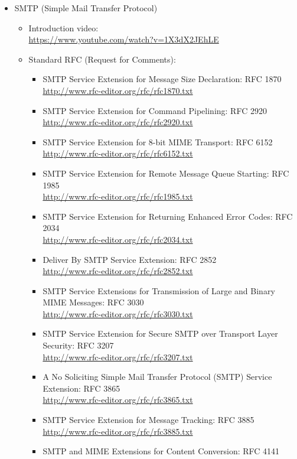 \begin{itemize}
\begin{itemize}
\end{itemize}
\item SMTP (Simple Mail Transfer Protocol)\\
\begin{itemize}
\item Introduction video:\\
\url{https://www.youtube.com/watch?v=1X3dX2JEhLE}
\item Standard RFC (Request for Comments): \\
\begin{itemize}
\item SMTP Service Extension for Message Size Declaration: RFC 1870\\
\url{http://www.rfc-editor.org/rfc/rfc1870.txt}
\item SMTP Service Extension for Command Pipelining: RFC 2920\\
\url{http://www.rfc-editor.org/rfc/rfc2920.txt}
\item SMTP Service Extension for 8-bit MIME Transport: RFC 6152\\
\url{http://www.rfc-editor.org/rfc/rfc6152.txt}
\item SMTP Service Extension for Remote Message Queue Starting: RFC 1985\\
\url{http://www.rfc-editor.org/rfc/rfc1985.txt}
\item SMTP Service Extension for  Returning Enhanced Error Codes: RFC 2034\\
\url{http://www.rfc-editor.org/rfc/rfc2034.txt}
\item Deliver By SMTP Service Extension: RFC 2852\\
\url{http://www.rfc-editor.org/rfc/rfc2852.txt}
\item SMTP Service Extensions for Transmission of Large and Binary 
MIME Messages: RFC 3030\\
\url{http://www.rfc-editor.org/rfc/rfc3030.txt}
\item SMTP Service Extension for Secure SMTP over Transport Layer 
Security: RFC 3207\\
\url{http://www.rfc-editor.org/rfc/rfc3207.txt}
\item A No Soliciting Simple Mail Transfer Protocol (SMTP) Service 
Extension: RFC 3865\\
\url{http://www.rfc-editor.org/rfc/rfc3865.txt}
\item SMTP Service Extension for Message Tracking: RFC 3885\\
\url{http://www.rfc-editor.org/rfc/rfc3885.txt}
\item SMTP and MIME Extensions for Content Conversion: RFC 4141\\

\end{itemize}
\end{itemize}
\end{itemize}
